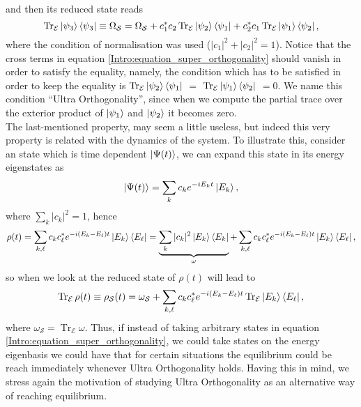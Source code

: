 and then its reduced state reads
\begin{equation}
\operatorname{Tr}_{\mathcal{E}}\mathinner{|{\psi_3}\rangle}\mathinner{\langle{\psi_3}|} \equiv \Omega_{\mathcal{S}}= \Omega_{\mathcal{S}}+c_1^*c_2\operatorname{Tr}_{\mathcal{E}}\mathinner{|{\psi_2}\rangle}\mathinner{\langle{\psi_1}|} + c_2^*c_1\operatorname{Tr}_{\mathcal{E}}\mathinner{|{\psi_1}\rangle}\mathinner{\langle{\psi_2}|},
\label{Intro:equation_super_orthogonality}
\end{equation}
where the condition of normalisation was used ($|c_1|^2 + |c_2|^2 =1$). Notice that the cross terms in equation \eqref{Intro:equation_super_orthogonality} should vanish in order to satisfy the equality, namely, the condition which has to be satisfied in order to keep the equality is $\operatorname{Tr}_{\mathcal{E}}\mathinner{|{\psi_2}\rangle}\mathinner{\langle{\psi_1}|}$ $=$ $\operatorname{Tr}_{\mathcal{E}}\mathinner{|{\psi_1}\rangle}\mathinner{\langle{\psi_2}|}$ $=0$.  We name this condition ``Ultra Orthogonality'', since when we compute the partial trace over the exterior product of $\mathinner{|{\psi_1}\rangle}$ and $\mathinner{|{\psi_2}\rangle}$ it becomes zero.\\

\indent The last-mentioned property, may seem a little useless, but indeed this very property is related with the dynamics of the system. To illustrate this, consider an state which is time dependent $\mathinner{|{\Psi(t)}\rangle}$, we can expand this state in its energy eigenstates as
\begin{equation}
\mathinner{|{\Psi(t)}\rangle}=\sum_{k} c_k e^{-iE_kt}\mathinner{|{E_k}\rangle},
\end{equation}
where $\sum_k|c_k|^2=1$, hence
\begin{equation}
\rho(t) = \sum_{ k,\ell}c_kc^*_\ell e^{-i(E_k-E_\ell)t}\mathinner{|{E_k}\rangle}\mathinner{\langle{E_\ell}|} = \underbrace{\sum_{ k}|c_k|^2 \mathinner{|{E_k}\rangle}\mathinner{\langle{E_k}|}}_{\omega}+\sum_{ k,\ell}c_kc^*_\ell e^{-i(E_k-E_\ell)t}\mathinner{|{E_k}\rangle}\mathinner{\langle{E_\ell}|},
\end{equation}
so when we look at the reduced state of $\rho(t)$ will lead to
\begin{equation}
\operatorname{Tr}_{\mathcal{E}} \rho(t) \equiv \rho_{\mathcal{S}}(t) =\omega_{\mathcal{S}} + \sum_{ k,\ell}c_kc^*_\ell e^{-i(E_k-E_\ell)t}\operatorname{Tr}_{\mathcal{E}}\mathinner{|{E_k}\rangle}\mathinner{\langle{E_\ell}|},
\label{Intro:equation_of_evolution}
\end{equation}
where $\omega_{\mathcal{S}} = \operatorname{Tr}_{\mathcal{E}} \omega$. Thus, if instead of taking arbitrary states in equation \eqref{Intro:equation_super_orthogonality}, we could take states on the energy eigenbasis we could have that for certain situations the equilibrium could be reach immediately whenever Ultra Orthogonality holds. Having this in mind, we stress again the motivation of studying Ultra Orthogonality as an alternative way of reaching equilibrium.\\

